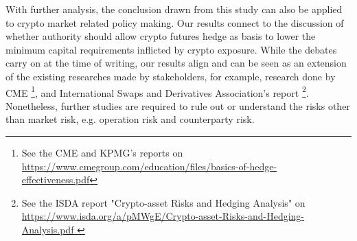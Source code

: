 \documentclass[11pt,a4paper,english]{article}
\begin{document}

With further analysis, the conclusion drawn from this study can also be applied to crypto market related policy making.
Our results connect to the discussion of whether authority should allow crypto futures hedge as basis to lower the minimum capital requirements inflicted by crypto exposure.
While the debates carry on at the time of writing, our results align and can be seen as an extension of the existing researches made by stakeholders,
for example, research done by CME \footnote{See the CME and KPMG's reports on \url{https://www.cmegroup.com/education/files/basics-of-hedge-effectiveness.pdf}},
and International Swaps and Derivatives Association's report \footnote{See the ISDA report "Crypto-asset Risks and Hedging Analysis" on \url{https://www.isda.org/a/pMWgE/Crypto-asset-Risks-and-Hedging-Analysis.pdf }}.
Nonetheless, further studies are required to rule out or understand the risks other than market risk, e.g. operation risk and counterparty risk. 
\end{document}
